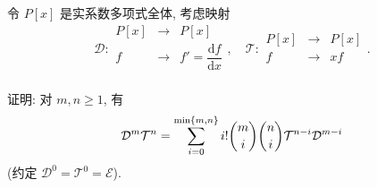 \documentclass{ctexart}
\begin{document}
\begin{exercisec}[2.5.3]
    令 $P[x]$ 是实系数多项式全体, 考虑映射
    \[\mathcal{D}:\begin{array}{rcl}
        P[x] & \to & P[x] \\
        f & \to & f'=\dfrac{\mathrm{d}f}{\mathrm{d}x} \\
    \end{array},\quad\mathcal{T}:\begin{array}{rcl}
        P[x] & \to & P[x] \\
        f & \to & xf \\
    \end{array}.\]

    证明: 对 $m,n\geq1$, 有
    \begin{equation}\label{eq2.6}
        \mathcal{D}^m\mathcal{T}^n=\sum\limits_{i=0}^{\min\{m,n\}}i!\dbinom{m}{i}\dbinom{n}{i}\mathcal{T}^{n-i}\mathcal{D}^{m-i}
    \end{equation}
    (约定 $\mathcal{D}^0=\mathcal{T}^0=\mathcal{E}$).
\end{exercisec}
\end{document}
